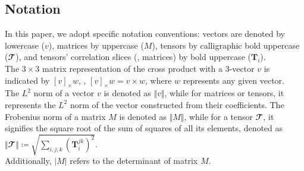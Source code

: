 \subsection{Notation}
In this paper, we adopt specific notation conventions: vectors are denoted by lowercase (\( v \)), matrices by uppercase (\( M \)), tensors by calligraphic bold uppercase (\( \mathbfcal{T} \)), and tensors' correlation slices (\ie, matrices) by bold uppercase (\( \bm{T}_i \)).\\

The \( 3 \times 3 \) matrix representation of the cross product with a 3-vector $v$ is indicated by \( [v]_{\times}w \), \ie, \( [v]_{\times}w = v \times w \), where \( w \) represents any given vector.\\

The \( L^2 \) norm of a vector \( v \) is denoted as \( \Vert v \Vert \), while for matrices or tensors, it represents the \( L^2 \) norm of the vector constructed from their coefficients. The Frobenius norm of a matrix \( M \) is denoted as \( \Vert M \Vert \), while for a tensor \( \mathbfcal{T} \), it signifies the square root of the sum of squares of all its elements, denoted as \( \Vert \mathbfcal{T} \Vert \coloneqq \sqrt{\sum_{i,j,k} (\bm{T}_{i}^{jk})^2} \).\\

Additionally, \( \vert M \vert \) refers to the determinant of matrix \( M \).

